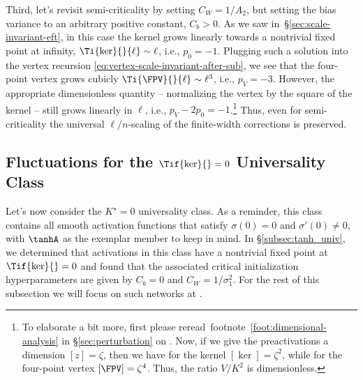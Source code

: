 \item
Third, let's revisit semi-criticality  by setting $C_W = 1/A_2$, but setting the bias variance to an arbitrary positive constant, $C_b>0$. As we saw in~\S\ref{sec:scale-invariant-eft},   
in this case the kernel grows linearly towards a nontrivial fixed point at infinity, $\Ti{\ker}{}{\ell}\sim \ell$, i.e., $p_0=-1$. Plugging such a solution into the vertex recursion \eqref{eq:vertex-scale-invariant-after-sub}, we see that the four-point vertex grows cubicly $\Ti{\FPV}{}{\ell} \sim \ell^3$, i.e., $p_V=-3$.  However, the appropriate dimensionless quantity
-- normalizing the vertex by the square of the kernel --
still grows linearly in $\ell$, i.e., $p_V-2p_0=-1$.\footnote{
To elaborate a bit more, first please reread~footnote~\ref{foot:dimensional-analysis} in \S\ref{sec:perturbation} on . Now, if we give the preactivations a dimension $[z]=\zeta$, then we have for the kernel $[\ker]=\zeta^2$, while for the four-point vertex $[\FPV]=\zeta^4$. Thus, the ratio $V/K^2$ is dimensionless.
}
Thus, even for semi-criticality the universal $\ell/n$-scaling of the finite-width corrections is preserved.
\ei



\subsection{Fluctuations for the \texorpdfstring{$\Tif{\ker}{}=0$}{K*=0} Universality Class}\label{subsec:tanh_univ_revisit}
Let's now consider the $K^{\star}=0$ universality class. As a reminder, this class contains all smooth activation functions that satisfy $\sigma(0)=0$ and $\sigma'(0)\ne0$, %
with $\tanhA$ as the exemplar member to keep in mind. 
In \S\ref{subsec:tanh_univ}, we determined that activations in this class have a nontrivial fixed point at $\Tif{\ker}{}=0$ and found that the associated critical initialization hyperparameters are given by $C_b=0$ and $C_W=1/\sigma_1^2$.
For the rest of this subsection
we will focus on such networks at . %

